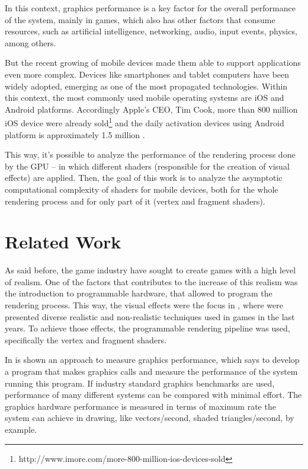 \documentclass[10pt, conference, compsocconf]{IEEEtran}
\begin{document}
In this context, graphics performance is a key factor for the overall performance 
of the system, mainly in games, which also has other factors that consume
resources, such as artificial intelligence, networking, audio, input events, physics, among
others.

But the recent growing of mobile devices made them able to support 
applications even more complex. Devices like smartphones and tablet computers
have been widely adopted, emerging as one of the most propagated technologies.
Within this context, the most commonly used mobile operating systems are iOS 
and Android platforms. Accordingly Apple's CEO, Tim Cook, more than 800 million iOS device
were already sold\footnote{http://www.imore.com/more-800-million-ios-devices-sold}
 and the daily activation devices using Android platform is approximately 1.5 million \cite{android2013}.

This way, it's possible to analyze the performance of the rendering process done
by the GPU -- in which different shaders (responsible for the creation of
visual effects) are applied. Then, the goal of this work is to analyze the asymptotic computational
complexity of shaders for mobile devices, both for the whole rendering process
and for only part of it (vertex and fragment shaders).

\section{Related Work}
\label{sec:related-work}

As said before, the game industry have sought to create games with a high level of realism.
One of the factors that contributes to the increase of this realism 
was the introduction to programmable hardware, that allowed to program the 
rendering process. This way, the visual effects were the focus in \cite{sbgames2}, where were 
presented diverse realistic and non-realistic techniques used in games in the last years. To
achieve those effects, the programmable rendering pipeline was used,
specifically the vertex and fragment shaders.

In \cite{compaq} is shown an approach to measure graphics performance, which says to develop
a program that makes graphics calls and measure the performance of the
system running this program. If industry standard graphics benchmarks are
used, performance of many different systems can be compared with minimal 
effort. The graphics hardware performance is measured
in terms of maximum rate the system can achieve in drawing, like vectors/second,
shaded triangles/second, by example.
\end{document}
